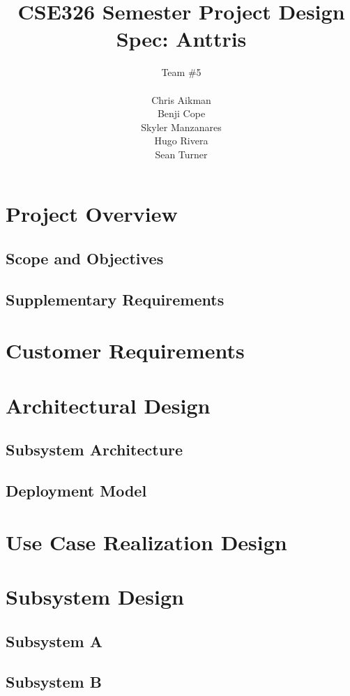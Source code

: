 \documentclass[12pt]{article}
\begin{document}
\title{CSE326 Semester Project Design Spec: Anttris}
\author{Team \#5\\\\Chris Aikman\\Benji Cope\\Skyler Manzanares\\Hugo Rivera\\Sean Turner}
\maketitle

\section{Project Overview}
\subsection{Scope and Objectives}
\subsection{Supplementary Requirements}
\section{Customer Requirements}
\section{Architectural Design}
\subsection{Subsystem Architecture}
\subsection{Deployment Model}
\section{Use Case Realization Design}
\section{Subsystem Design}
\subsection{Subsystem A}
\subsection{Subsystem B}
\end{document}
